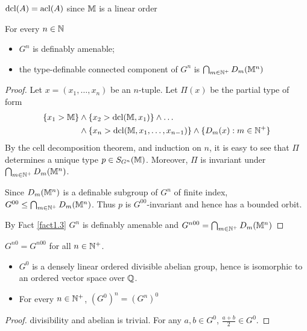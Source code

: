 \documentclass[11pt]{article}
\begin{document}
\(\operatorname{dcl}(A)=\operatorname{acl}(A)\) since \(\mathbb{M}\) is a linear order  \label{Problem1}

\begin{fact}[]
For every \(n\in\mathbb{N}\)
\begin{itemize}
\item \(G^n\) is definably amenable;
\item the type-definable connected component of \(G^n\) is \(\bigcap_{m\in\mathbb{N}^+}D_m(\mathbb{M}^n)\)
\end{itemize}
\end{fact}

\begin{proof}
Let \(x=(x_1,\dots,x_n)\) be an \(n\)-tuple. Let \(\Pi(x)\) be the partial type of form
\begin{align*}
\{x_1>\mathbb{M}\}&\wedge\{x_2>\operatorname{dcl}(\mathbb{M},x_1)\}\wedge\dots\\
&\wedge\{x_n>\operatorname{dcl}(\mathbb{M},x_1,\dots,x_{n-1})\}\wedge\{D_m(x):m\in\mathbb{N}^+\}
\end{align*}
By the cell decomposition theorem, and induction on \(n\), it is easy to see that \(\Pi\) determines a
unique type \(p\in S_{G^n}(\mathbb{M})\). Moreover, \(\Pi\) is invariant under \(\bigcap_{m\in\mathbb{N}^+}D_m(\mathbb{M}^n)\).

Since \(D_m(\mathbb{M}^n)\) is a definable subgroup of \(G^n\) of finite index, \(G^{00}\le\bigcap_{m\in\mathbb{N}^+}D_m(\mathbb{M}^n)\).
Thus \(p\) is \(G^{00}\)-invariant and hence has a bounded orbit.

By Fact \ref{fact1.3} \(G^n\) is definably amenable and \(G^{n00}=\bigcap_{m\in\mathbb{N}^+}D_m(\mathbb{M}^n)\)
\end{proof}

\begin{corollary}[]
\(G^{n0}=G^{n00}\) for all \(n\in\mathbb{N}^+\).
\end{corollary}

\begin{remark}
\label{1.11}
\begin{itemize}
\item \(G^0\) is a densely linear ordered divisible abelian group, hence is isomorphic to an ordered
vector space over \(\mathbb{Q}\).
\item For every \(n\in\mathbb{N}^+\), \((G^0)^n=(G^n)^0\)
\end{itemize}
\end{remark}

\begin{proof}
divisibility and abelian is trivial. For any \(a,b\in G^0\), \(\frac{a+b}{2}\in G^0\).
\end{proof}
\end{document}
